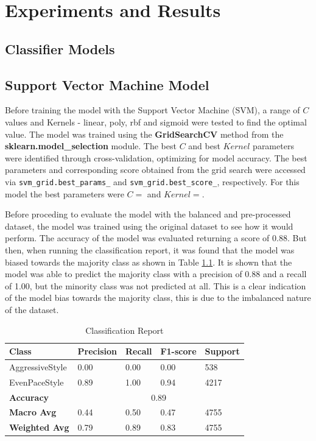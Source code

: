 \chapter{Experiments and Results}

\section{Classifier Models}

\section{Support Vector Machine Model}
Before training the model with the Support Vector Machine (SVM), a range of $C$ values and Kernels - linear, poly, rbf and sigmoid were tested to find the optimal value. The model 
was trained using the \textbf{GridSearchCV} method from the \textbf{sklearn.model\_selection} module.
The best $C$ and best $Kernel$ parameters were identified through cross-validation, optimizing for model accuracy. The best parameters and corresponding score obtained from the grid search were 
accessed via \texttt{svm\_grid.best\_params\_} and \texttt{svm\_grid.best\_score\_}, respectively.
For this model the best parameters were $C=$ and $Kernel=$. 

Before proceding to evaluate the model with the balanced and pre-processed dataset, the model was trained using the original dataset to see how it would perform. The accuracy of the model
was evaluated returning a score of 0.88. But then, when running the classification report, it was found that the model was biased towards the majority class as shown in 
Table \ref{table:svm_classification_report}.
It is shown that the model was able to predict the majority class with a precision of 0.88 and a recall of 1.00, but the minority class was not predicted at all. This is a clear 
indication of the model bias towards the majority class, this is due to the imbalanced nature of the dataset.

\begin{table}[H]
    \centering
    \begin{tabular}{|l|l|l|l|l|}
    \hline
    \textbf{Class} & \textbf{Precision} & \textbf{Recall} & \textbf{F1-score} & \textbf{Support} \\ \hline
    AggressiveStyle & 0.00 & 0.00 & 0.00 & 538 \\ \hline
    EvenPaceStyle & 0.89 & 1.00 & 0.94 & 4217 \\ \hline
    \textbf{Accuracy} & \multicolumn{4}{c|}{0.89} \\ \hline
    \textbf{Macro Avg} & 0.44 & 0.50 & 0.47 & 4755 \\ \hline
    \textbf{Weighted Avg} & 0.79 & 0.89 & 0.83 & 4755 \\ \hline
    \end{tabular}
    \caption{Classification Report}
    \label{table:svm_classification_report}
\end{table}

